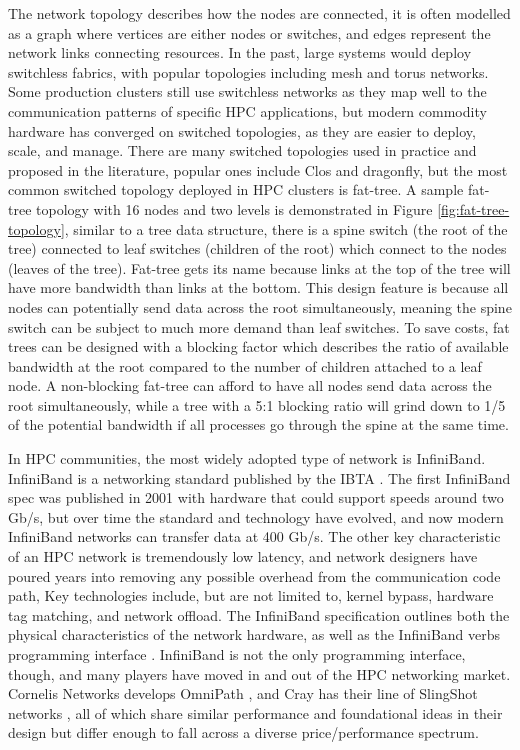 The network topology describes how the nodes are connected, it is often modelled as a graph where vertices are either nodes or switches, and edges represent the network links connecting resources.
In the past, large systems would deploy switchless fabrics, with popular topologies including mesh and torus networks.
Some production clusters still use switchless networks as they map well to the communication patterns of specific \gls{HPC} applications, but modern commodity hardware has converged on switched topologies, as they are easier to deploy, scale, and manage. 
There are many switched topologies used in practice and proposed in the literature, popular ones include Clos and dragonfly, but the most common switched topology deployed in \gls{HPC} clusters is fat-tree.
A sample fat-tree topology with 16 nodes and two levels is demonstrated in Figure \ref{fig:fat-tree-topology}, similar to a tree data structure, there is a spine switch (the root of the tree) connected to leaf switches (children of the root) which connect to the nodes (leaves of the tree).
Fat-tree gets its name because links at the top of the tree will have more bandwidth than links at the bottom.
This design feature is because all nodes can potentially send data across the root simultaneously, meaning the spine switch can be subject to much more demand than leaf switches.
To save costs, fat trees can be designed with a blocking factor which describes the ratio of available bandwidth at the root compared to the number of children attached to a leaf node.
A non-blocking fat-tree can afford to have all nodes send data across the root simultaneously, while a tree with a 5:1 blocking ratio will grind down to 1/5 of the potential bandwidth if all processes go through the spine at the same time.



In \gls{HPC} communities, the most widely adopted type of network is InfiniBand. 
InfiniBand is a networking standard published by the \gls{IBTA} \cite{IBSpec}.
The first InfiniBand spec was published in 2001 with hardware that could support speeds around two Gb/s, but over time the standard and technology have evolved, and now modern InfiniBand networks can transfer data at 400 Gb/s.
The other key characteristic of an \gls{HPC} network is tremendously low latency, and network designers have poured years into removing any possible overhead from the communication code path, 
Key technologies include, but are not limited to, kernel bypass, hardware tag matching, and network offload.
The InfiniBand specification outlines both the physical characteristics of the network hardware, as well as the InfiniBand verbs programming interface \cite{IBSpec}.
InfiniBand is not the only programming interface, though, and many players have moved in and out of the \gls{HPC} networking market.
Cornelis Networks develops OmniPath \cite{Birrittella2015OmniPath}, and Cray has their line of SlingShot networks \cite{DDeSensi2020InDepthAnalysisOfSlingshot}, all of which share similar performance and foundational ideas in their design but differ enough to fall across a diverse price/performance spectrum.

